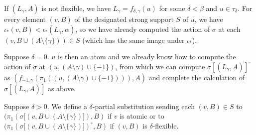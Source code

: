 \documentclass[12pt]{article}
\begin{document}
\begin{enumerate}
If $(L_{\gamma},A)$ is not flexible, we have $L_\gamma = f_{\delta,\gamma}(u)$ for some $\delta<\beta$ and $u \in \tau_\delta$.  For every element $(v,B)$ of the designated strong support $S$ of $u$, we have $\iota_*(v,B)<\iota_*(L_\gamma,\alpha)$, so we have already computed
the action of $\sigma$ at each $(v,B\cup (A \setminus \{\gamma\}))\in S$ (which has the same image under $\iota_*$).  

Suppose $\delta=0$.  $u$ is then an atom and we already know how to compute the action of $\sigma$ at $(u,(A \setminus \gamma) \cup \{-1\})$, from which we can compute  $\sigma[(L_\gamma,A)]^\circ$ as $(f_{-1,\gamma}(\pi_1((u,(A \setminus \gamma) \cup \{-1\}))),A)$ and complete the calculation of  $\sigma[(L_\gamma,A)]$ as above.

Suppose $\delta>0$.  We define a $\delta$-partial substitution sending each $(v,B)\in S$ to $(\pi_1(\sigma[(v,B\cup (A \setminus \{\gamma\})]),B)$ if $v$ is atomic or to $(\pi_1(\sigma[(v,B\cup (A \setminus \{\gamma\})])^\circ,B)$ if $(v,B)$ is $\delta$-flexible.






\end{enumerate}
\end{document}
